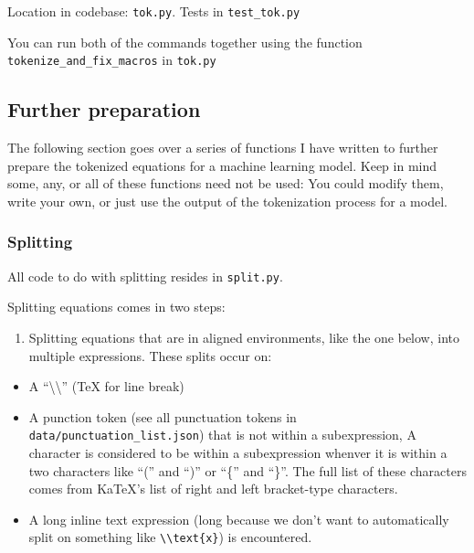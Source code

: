 \documentclass[]{article}
\providecommand{\tightlist}{%
  \setlength{\itemsep}{0pt}\setlength{\parskip}{0pt}}
\begin{document}
Location in codebase: \texttt{tok.py}. Tests in \texttt{test\_tok.py}

You can run both of the commands together using the function
\texttt{tokenize\_and\_fix\_macros} in \texttt{tok.py}

\hypertarget{further-preparation}{%
\subsection{Further preparation}\label{further-preparation}}

The following section goes over a series of functions I have written to
further prepare the tokenized equations for a machine learning model.
Keep in mind some, any, or all of these functions need not be used: You
could modify them, write your own, or just use the output of the
tokenization process for a model.

\hypertarget{splitting}{%
\subsubsection{Splitting}\label{splitting}}

All code to do with splitting resides in \texttt{split.py}.

Splitting equations comes in two steps:

\begin{enumerate}
\def\labelenumi{\arabic{enumi}.}
\tightlist
\item
  Splitting equations that are in aligned environments, like the one
  below, into multiple expressions. These splits occur on:
\end{enumerate}

\begin{itemize}
\tightlist
\item
  A ``\textbackslash{}\textbackslash{}'' (TeX for line break)
\item
  A punction token (see all punctuation tokens in
  \texttt{data/punctuation\_list.json}) that is not within a
  subexpression, A character is considered to be within a subexpression
  whenver it is within a two characters like ``('' and ``)'' or ``\{''
  and ``\}''. The full list of these characters comes from KaTeX's list
  of right and left bracket-type characters.
\item
  A long inline text expression (long because we don't want to
  automatically split on something like
  \texttt{\textbackslash{}\textbackslash{}text\{x\}}) is encountered.
\end{itemize}
\end{document}

